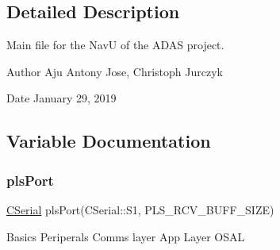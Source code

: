 \subsection{Detailed Description}
Main file for the NavU of the A\+D\+AS project. 

\begin{DoxyAuthor}{Author}
Aju Antony Jose, Christoph Jurczyk 
\end{DoxyAuthor}
\begin{DoxyDate}{Date}
January 29, 2019 
\end{DoxyDate}


\subsection{Variable Documentation}
\mbox{\label{_a_d_a_s___nav_u_8ino_a5427ed2b254fc7bb97bb9c8b92af7d60}} 
\subsubsection{\texorpdfstring{plsPort}{plsPort}}
{\footnotesize\ttfamily \mbox{\hyperlink{class_c_serial}{C\+Serial}} pls\+Port(C\+Serial\+::\+S1, P\+L\+S\+\_\+\+R\+C\+V\+\_\+\+B\+U\+F\+F\+\_\+\+S\+I\+ZE)}

Basics Periperals Comms layer App Layer O\+S\+AL 